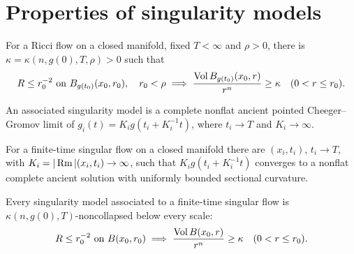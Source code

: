 \section{Properties of singularity models}

\begin{theorem}
\label{thm:chow-iv-no-local-collapsing}

For a Ricci flow on a closed manifold, fixed \(T<\infty\) and \(\rho>0\),
there is \(\kappa=\kappa(n,g(0),T,\rho)>0\) such that
\[
R\le r_0^{-2}\text{ on }B_{g(t_0)}(x_0,r_0),\quad r_0<\rho
\implies
\frac{\operatorname{Vol} B_{g(t_0)}(x_0,r)}{r^n}\ge\kappa\quad(0<r\le r_0).
\]
\end{theorem}

\begin{definition}
\label{def:chow-iv-finite-time-singularity-model}

An associated singularity model is a complete nonflat ancient pointed
Cheeger--Gromov limit of \(g_i(t)=K_i g(t_i+K_i^{-1}t)\), where
\(t_i\to T\) and \(K_i\to\infty\).
\end{definition}

\begin{theorem}
\label{thm:chow-iv-existence-singularity-models}


For a finite-time singular flow on a closed manifold there are
\((x_i,t_i)\), \(t_i\to T\), with \(K_i=|\operatorname{Rm}|(x_i,t_i)\to\infty\), such that
\(K_i g(t_i+K_i^{-1}t)\) converges to a nonflat complete ancient solution
with uniformly bounded sectional curvature.
\end{theorem}

\begin{theorem}
\label{thm:chow-iv-singularity-models-noncollapsed}


Every singularity model associated to a finite-time singular flow is
\(\kappa(n,g(0),T)\)-noncollapsed below every scale:
\[
R\le r_0^{-2}\text{ on }B(x_0,r_0)\implies
\frac{\operatorname{Vol} B(x_0,r)}{r^n}\ge\kappa\quad(0<r\le r_0).
\]
\end{theorem}

